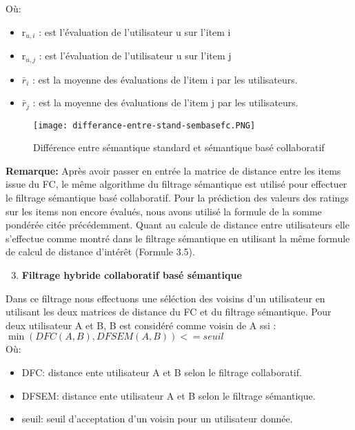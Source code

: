 Où:

\begin{itemize}
	\item r$_{u,i}$  : est l’évaluation de l’utilisateur u sur l’item i 
	\item r$_{u,j}$ : est l’évaluation de l’utilisateur u sur l’item j
	\item $\bar{r}_{i}$ : est la moyenne des évaluations de l’item i par les utilisateurs.
	\item $\bar{r}_{j}$ : est la moyenne des évaluations de l’item j par les utilisateurs.
\end{itemize}

\begin{figure}[H]
	\centering
	\texttt{[image: differance-entre-stand-sembasefc.PNG]}
	\caption{Différence entre sémantique standard et sémantique basé collaboratif}
	\label{fig:semfc}
\end{figure}
\textbf{Remarque:} Après avoir passer en entrée la matrice de distance entre les items issue du FC, le même algorithme du filtrage sémantique est utilisé pour effectuer le filtrage sémantique basé collaboratif.
Pour la prédiction des valeurs des ratings sur les items non encore évalués, nous avons utilisé la formule de la somme pondérée citée précédemment.
Quant au calcule de distance entre utilisateurs elle s'effectue comme montré dans le filtrage sémantique en utilisant la même formule de calcul de distance d'intérêt (Formule 3.5). \\


\begin{enumerate}[nosep,label=\textbf{\arabic*)}]
	\setcounter{enumi}{2}
	\item \textbf{Filtrage hybride collaboratif basé sémantique}
\end{enumerate}\mbox{}\indent \iffalse  Dans le filtrage collaboratif, la matrice de distance est calculée avec la formule Pearson, qui donne une distance comprise entre [-1,1], si la distance est égale à 0 cela signifie qu'on ne sait pas si les deux utilisateurs sont corrélés ou pas et ça nous mène à un cas d'indétermination, donc pour y remédier on utilise la matrice de distance du filtrage sémantique dans le cas ou on trouve dans la matrice de distance du filtrage collaboratif \textit{user-user} des distances égalent à 0.
\fi Dans ce filtrage nous effectuons une séléction des voisins d'un utilisateur en utilisant les deux matrices de distance du FC et du filtrage sémantique.
Pour deux utilisateur A et B, B est considéré comme voisin de A ssi :\\
$\min( DFC(A,B) , DFSEM(A,B) ) <= seuil$
\\
Où:
\begin{itemize}
	\item DFC: distance ente utilisateur A et B selon le filtrage collaboratif.
	\item DFSEM: distance ente utilisateur A et B selon le filtrage sémantique.
	\item seuil: seuil d'acceptation d'un voisin pour un utilisateur donnée.
\end{itemize}

